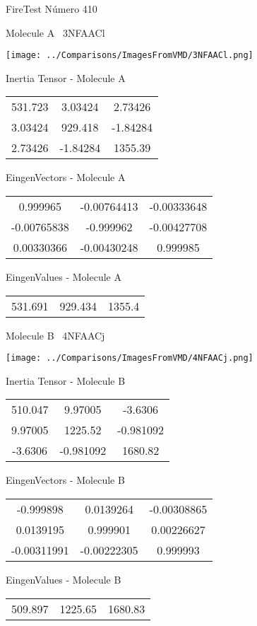 \vtab[-3cm]
\begin{center}
{\large FireTest \tab Número 410}
\end{center}
\begin{multicols}{2}
\begin{center}

Molecule A \
3NFAACl

\texttt{[image: ../Comparisons/ImagesFromVMD/3NFAACl.png]}

Inertia Tensor - Molecule A \\
\begin{tabular}{|c c c|}
531.723	 & 	3.03424	 & 	2.73426	 \\
3.03424	 & 	929.418	 & 	-1.84284	 \\
2.73426	 & 	-1.84284	 & 	1355.39
\end{tabular}

\vtab
 EingenVectors - Molecule A     \\
\begin{tabular}{|c c c|}
0.999965	 & 	-0.00764413	 & 	-0.00333648	 \\
-0.00765838	 & 	-0.999962	 & 	-0.00427708	 \\
0.00330366	 & 	-0.00430248	 & 	0.999985
\end{tabular}

\vtab
 EingenValues - Molecule A     \\
\begin{tabular}{|c c c|}
531.691	 & 	929.434	 & 	1355.4	 \\
\end{tabular}
\columnbreak

Molecule B \
4NFAACj

\texttt{[image: ../Comparisons/ImagesFromVMD/4NFAACj.png]}

Inertia Tensor - Molecule B \\
\begin{tabular}{|c c c|}
510.047	 & 	9.97005	 & 	-3.6306	 \\
9.97005	 & 	1225.52	 & 	-0.981092	 \\
-3.6306	 & 	-0.981092	 & 	1680.82
\end{tabular}

\vtab
 EingenVectors - Molecule B     \\
\begin{tabular}{|c c c|}
-0.999898	 & 	0.0139264	 & 	-0.00308865	 \\
0.0139195	 & 	0.999901	 & 	0.00226627	 \\
-0.00311991	 & 	-0.00222305	 & 	0.999993
\end{tabular}

\vtab
 EingenValues - Molecule B     \\
\begin{tabular}{|c c c|}
509.897	 & 	1225.65	 & 	1680.83	 \\
\end{tabular}

\end{center}
\end{multicols}

